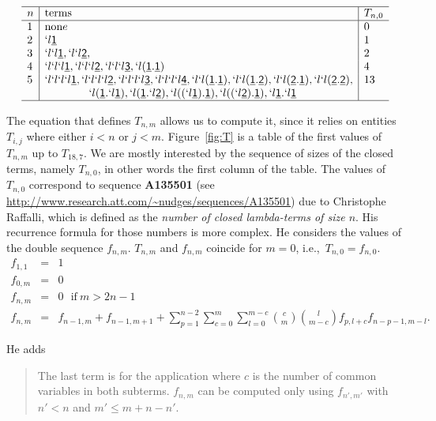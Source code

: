 \documentclass[preprint,authoryear]{elsarticle}
\newcommand{\ie}{i.e.,~}
\newcommand{\Var}[1]{\underline{\mathsf{#1}}}
\begin{document}
\begin{footnotesize}
  \begin{displaymath}
    \begin{array}{l | l | l}
      \hline
      n & \textrm{terms} & T_{n,0}\\
      \hline
      1& \textrm{non}e & 0 \\
      2& `l \Var{1} & 1 \\
      3& `l `l \Var{1},  `l `l \Var{2}, & 2 \\
      4&  `l `l  `l\Var{1},  `l `l `l\Var{2}, `l `l `l\Var{3}, `l (\Var{1} . \Var{1})& 4 \\
      5&  `l`l `l  `l\Var{1},  `l`l `l  `l\Var{2},  `l`l `l  `l\Var{3},  `l`l `l  `l\Var{4},
      `l`l(\Var{1}.\Var{1}),`l`l(\Var{1}.\Var{2}),`l`l(\Var{2}.\Var{1}),`l`l(\Var{2}.\Var{2}), &13
      \\
      & \qquad \qquad `l (\Var{1} .`l\Var{1}),`l
      (\Var{1} .`l\Var{2}),  `l ((`l\Var{1}) .\Var{1}), `l ((`l\Var{2}) .\Var{1}),`l \Var{1} . `l \Var{1}    & \\ 
          \hline
    \end{array}
  \end{displaymath}
\end{footnotesize}
The equation that defines $T_{n,m}$ allows us to compute it, since it relies on entities
$T_{i,j}$ where either $i<n$ or $j<m$.  Figure~\ref{fig:T} is a table of the first values
of $T_{n,m}$ up to $T_{18,7}$.  We are mostly interested by the sequence of sizes of the
closed terms, namely $T_{n,0}$, in other words the first column of the table.  The values
of $T_{n,0}$ correspond to sequence \textbf{A135501} (see
\url{http://www.research.att.com/~nudges/sequences/A135501}) due to Christophe Raffalli,
which is defined as the \emph{number of closed lambda-terms of size $n$}.  His recurrence formula for those
numbers is more complex.  He considers the values of the double sequence $f_{n,m}$.
$T_{n,m}$ and $f_{n,m}$ coincide for $m=0$, \ie $T_{n,0} = f_{n,0}$.
\begin{eqnarray*}
f_{1,1} &=& 1\\ 
f_{0,m} &=& 0\\  
f_{n,m} &=& 0 \textrm{~ if}~ m>2n-1\\
f_{n,m} &= &f_{n-1,m} + f_{n-1,m+1} + \sum_{p=1}^{n-2} \sum_{c=0}^{m} \sum_{l=0}^{m - c} {c \choose m} {l \choose m-c} f_{p,l+c} f_{n-p-1,m-l}.
\end{eqnarray*}

He adds
\begin{sf}
  \begin{quote}
    The last term is for the application where $c$ is the number of common variables in
    both subterms.  $f_{n,m}$ can be computed only using $f_{n',m'}$ with $n' < n$ and $m'
    \le m + n - n'$.
  \end{quote}
\end{sf}
\end{document}
